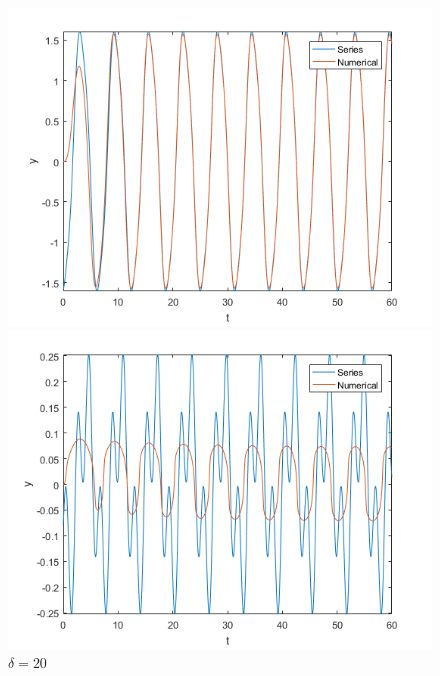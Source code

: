 \documentclass[10pt,a4paper]{report}
\begin{document}
\begin{figure}[ht]
\begin{minipage}[b]{0.5\linewidth}
\centering
\includegraphics[width=\textwidth]{q8d1.png}
\caption{$\delta=1$}
\label{fig:figure1}
\end{minipage}
\hspace{0.5cm}
\begin{minipage}[b]{0.5\linewidth}
\centering
\includegraphics[width=\textwidth]{q8d2.png}
\caption{$\delta=20$}
\label{fig:figure2}
\end{minipage}
\end{figure}

\newpage
\end{document}
